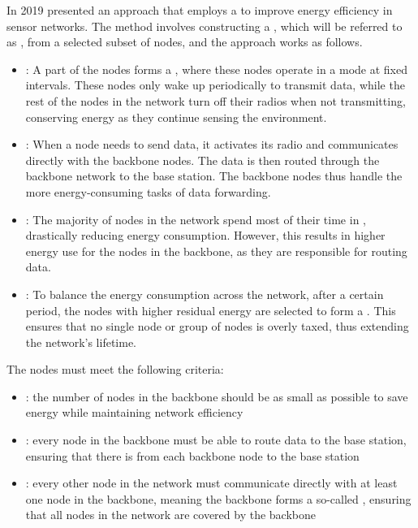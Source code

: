 \documentclass[a4paper, 12pt]{report}
\begin{document}
    In 2019 \textcite{sal19} presented an approach that employs a  to improve energy efficiency in sensor networks. The method involves constructing a , which will be referred to as , from a selected subset of nodes, and the approach works as follows.

    \begin{itemize}
        \item {}: A part of the nodes forms a , where these nodes operate in a  mode at fixed intervals. These nodes only wake up periodically to transmit data, while the rest of the nodes in the network turn off their radios when not transmitting, conserving energy as they continue sensing the environment.
        \item {}: When a node needs to send data, it activates its radio and communicates directly with the backbone nodes. The data is then routed through the backbone network to the base station. The backbone nodes thus handle the more energy-consuming tasks of data forwarding.
        \item {}: The majority of nodes in the network spend most of their time in , drastically reducing energy consumption. However, this results in higher energy use for the nodes in the backbone, as they are responsible for routing data. 
        \item {}: To balance the energy consumption across the network, after a certain period, the nodes with higher residual energy are selected to form a . This ensures that no single node or group of nodes is overly taxed, thus extending the network's lifetime.
    \end{itemize}

    The  nodes must meet the following criteria:

    \begin{itemize}
        \item {}: the number of nodes in the backbone should be as small as possible to save energy while maintaining network efficiency
        \item {}: every node in the backbone must be able to route data to the base station, ensuring that there is  from each backbone node to the base station
        \item {}: every other node in the network must communicate directly with at least one node in the backbone, meaning the backbone forms a so-called , ensuring that all nodes in the network are covered by the backbone
    \end{itemize}
\end{document}
